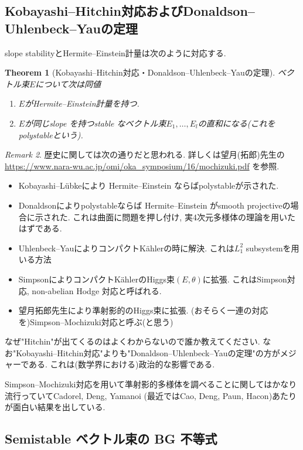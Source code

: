 \documentclass[dvipdfmx,a4paper,11pt]{article} %
\newtheorem{thm}{Theorem}[section]
\theoremstyle{definition}
\theoremstyle{remark}
\newtheorem{rem}[thm]{Remark}
\numberwithin{equation}{section}
\begin{document}
\subsection{Kobayashi--Hitchin対応およびDonaldson--Uhlenbeck--Yauの定理}

slope stabilityとHermite--Einstein計量は次のように対応する.

\begin{thm}[Kobayashi--Hitchin対応・Donaldson--Uhlenbeck--Yauの定理]
ベクトル束$E$について次は同値
\begin{enumerate}
\item $E$がHermite--Einstein計量を持つ.
\item $E$が同じslope を持つstable なベクトル束$E_1, \ldots, E_l$の直和になる(これをpolystableという).
\end{enumerate}
\end{thm}

\begin{rem}
歴史に関しては次の通りだと思われる. 詳しくは望月(拓郎)先生の\url{https://www.nara-wu.ac.jp/omi/oka_symposium/16/mochizuki.pdf}
を参照. 
\begin{itemize}
\item Kobayashi--Lübkeにより Hermite--Einstein ならばpolystableが示された. 
\item Donaldsonによりpolystableならば Hermite--Einstein がsmooth projectiveの場合に示された. これは曲面に問題を押し付け, 実4次元多様体の理論を用いたはずである. 
\item Uhlenbeck--YauによりコンパクトKählerの時に解決. これは$L^{2}_{1}$ subsystemを用いる方法
\item SimpsonによりコンパクトKählerのHiggs束$(E, \theta)$に拡張. これはSimpson対応, non-abelian Hodge 対応と呼ばれる. 
\item 望月拓郎先生により準射影的のHiggs束に拡張. (おそらく一連の対応を)Simpson--Mochizuki対応と呼ぶ(と思う)
\end{itemize}
なぜ"Hitchin"が出てくるのはよくわからないので誰か教えてください. 
なお"Kobayashi--Hitchin対応"よりも"Donaldson--Uhlenbeck--Yauの定理"の方がメジャーである. 
これは(数学界における)政治的な影響である. 

Simpson--Mochizuki対応を用いて準射影的多様体を調べることに関してはかなり流行っていてCadorel, Deng, Yamanoi (最近ではCao, Deng, Paun, Hacon)あたりが面白い結果を出している.
\end{rem}

\subsection{Semistable ベクトル束の BG 不等式}
\end{document}
